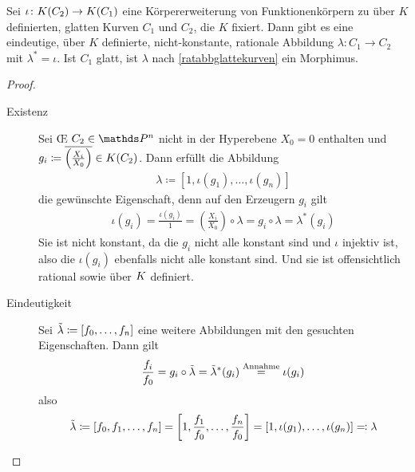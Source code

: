 \begin{Lemma}\label{erweiterungzuratabb}
  Sei $\iota\colon K(C_2)\to K(C_1)$ eine Körpererweiterung von
  Funktionenkörpern zu über $K$ definierten, glatten Kurven $C_1$ und
  $C_2$, die $K$ fixiert. Dann gibt es eine 
  eindeutige, über $K$ definierte, nicht-konstante, rationale
  Abbildung $\lambda\colon C_1\to C_2$ mit $\lambda^* = \iota$.
  Ist $C_1$ glatt, ist $\lambda$ nach \autoref{ratabbglattekurven}
  ein Morphimus.
  \begin{proof}
    \begin{description}
    \item[Existenz] Sei \OE{} $C_2\in\P^n$ nicht in der Hyperebene
      $X_0=0$ enthalten und
      $g_i\coloneqq\overline{\left(\frac{X_i}{X_0}\right)}\in K(C_2)$.
      Dann erfüllt die Abbildung
      \begin{gather*}
        \lambda\coloneqq \left[1, \iota(g_1),\dotsc,\iota(g_n)\right]
      \end{gather*}
      die gewünschte Eigenschaft, denn auf den Erzeugern $g_i$ gilt
      \begin{gather*}
        \iota(g_i) 
        = \frac{\iota(g_i)}{1} 
        = \left(\frac{X_i}{X_0}\right)\circ\lambda
        = g_i\circ\lambda
        = \lambda^*(g_i)
      \end{gather*}
      Sie ist nicht konstant, da die
      $g_i$ nicht alle konstant sind und $\iota$ injektiv ist, also
      die $\iota(g_i)$ ebenfalls nicht alle konstant sind. Und sie
      ist offensichtlich rational sowie über $K$ definiert.
    \item[Eindeutigkeit]
      Sei $\tilde\lambda\coloneqq[f_0,\dotsc,f_n]$ eine weitere
      Abbildungen mit den gesuchten Eigenschaften.
      Dann gilt
      \begin{gather*}
        \frac{f_i}{f_0}
        = g_i\circ\tilde\lambda
        = \tilde\lambda^*(g_i) 
        \overset{\text{Annahme}}{=}
        \iota(g_i)
      \end{gather*}
      also 
      \begin{gather*}
        \tilde\lambda
        \coloneqq \left[ f_0,f_1,\dotsc,f_n \right]
        = \left[ 1, \frac{f_1}{f_0}, \dotsc, \frac{f_n}{f_0}\right]
        = \left[ 1, \iota(g_1), \dotsc, \iota(g_n) \right]
        \eqqcolon \lambda
      \end{gather*}
    \end{description}
  \end{proof}
\end{Lemma}

